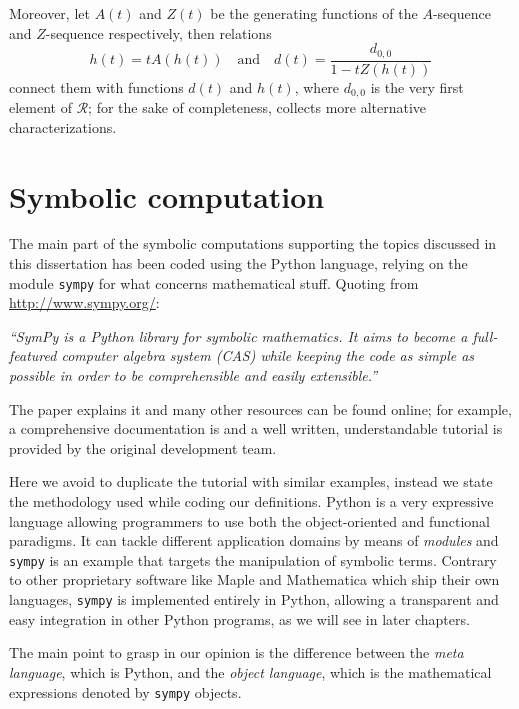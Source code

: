 Moreover, let $A(t)$ and $Z(t)$ be the generating functions of the $A$-sequence
and $Z$-sequence respectively, then relations
\begin{displaymath}
    h(t) = tA(h(t)) \quad\text{and}\quad d(t)=\frac{d_{0,0}}{1-tZ(h(t))}
\end{displaymath}
connect them with functions $d(t)$ and $h(t)$, where $d_{0,0}$ is the very
first element of $\mathcal{R}$; for the sake of completeness,
\citep{MRSV97} collects more alternative characterizations.

\section{Symbolic computation}

The main part of the symbolic computations supporting the topics discussed in
this dissertation has been coded using the Python language, relying on the
module \verb|sympy| for what concerns mathematical stuff. Quoting from
\url{http://www.sympy.org/}:
\begin{center}
\textit{ ``SymPy is a Python library for symbolic mathematics. It aims to
become a full-featured computer algebra system (CAS) while keeping the code as
simple as possible in order to be comprehensible and easily extensible.''}
\end{center}
The paper \citep{10.7717/peerj-cs.103} explains it and many other resources can
be found online; for example, a comprehensive documentation is
\citep{sympy:doc} and a well written, understandable tutorial
\citep{sympy:tutorial} is provided by the original development team.

Here we avoid to duplicate the tutorial with similar examples, instead we state
the methodology used while coding our definitions. Python is a very expressive
language allowing programmers to use both the object-oriented and functional
paradigms. It can tackle different application domains by means of
\textit{modules} and \verb|sympy| is an example that targets the manipulation
of symbolic terms.  Contrary to other proprietary software like Maple and
Mathematica which ship their own languages, \verb|sympy| is implemented
entirely in Python, allowing a transparent and easy integration in other Python
programs, as we will see in later chapters.

The main point to grasp in our opinion is the difference between the
\textit{meta language}, which is Python, and the \textit{object language},
which is the mathematical expressions denoted by \verb|sympy| objects.

